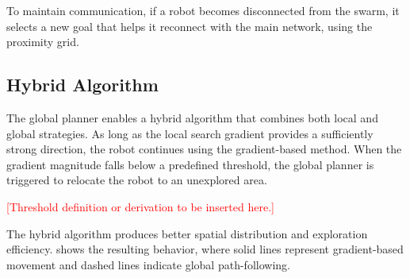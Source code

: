 To maintain communication, if a robot becomes disconnected from the swarm, it selects a new goal that helps it reconnect with the main network, using the proximity grid.

\subsection{Hybrid Algorithm}
The global planner enables a hybrid algorithm that combines both local and global strategies. As long as the local search gradient provides a sufficiently strong direction, the robot continues using the gradient-based method. When the gradient magnitude falls below a predefined threshold, the global planner is triggered to relocate the robot to an unexplored area.

\textcolor{red}{[Threshold definition or derivation to be inserted here.]}

The hybrid algorithm produces better spatial distribution and exploration efficiency.  shows the resulting behavior, where solid lines represent gradient-based movement and dashed lines indicate global path-following.

